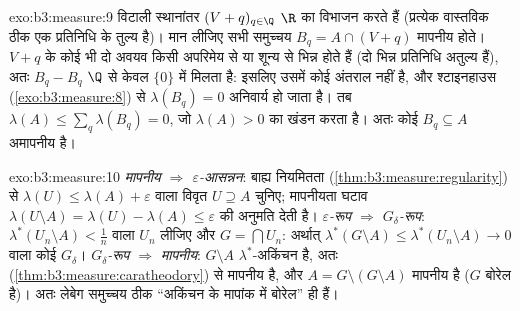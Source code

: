 \begin{solution}{exo:b3:measure:9}
विटाली स्थानांतर $(V + q)_{q\in\Q}$ $\R$ का विभाजन करते हैं (प्रत्येक वास्तविक
ठीक एक प्रतिनिधि के तुल्य है)। मान लीजिए सभी समुच्चय $B_q = A \cap (V + q)$ मापनीय
होते। $V + q$ के कोई भी दो अवयव किसी अपरिमेय से या शून्य से भिन्न होते
हैं (दो भिन्न प्रतिनिधि अतुल्य हैं), अतः $B_q - B_q$ $\Q$ से केवल $\{0\}$
में मिलता है: इसलिए उसमें कोई अंतराल नहीं है, और श्टाइनहाउस (\cref{exo:b3:measure:8})
से $\lambda(B_q) = 0$ अनिवार्य हो जाता है। तब $\lambda(A) \leq \sum_{q}\lambda(B_q) = 0$, जो $\lambda(A) > 0$ का खंडन करता है।
अतः कोई $B_q \subseteq A$ अमापनीय है।
\end{solution}

\begin{solution}{exo:b3:measure:10}
\emph{मापनीय $\Rightarrow$ $\varepsilon$-आसन्नन}: बाह्य नियमितता (\cref{thm:b3:measure:regularity}) से $\lambda(U) \leq \lambda(A) +
\varepsilon$
वाला विवृत $U \supseteq A$ चुनिए; मापनीयता घटाव $\lambda(U\setminus A) = \lambda(U) - \lambda(A) \leq
\varepsilon$ की अनुमति देती है।
\emph{$\varepsilon$-रूप $\Rightarrow$ $G_\delta$-रूप}: $\lambda^*(U_n\setminus
A) < \frac1n$ वाला $U_n$ लीजिए और $G = \bigcap U_n$:
अर्थात् $\lambda^*(G\setminus A) \leq \lambda^*(U_n\setminus A) \to 0$ वाला कोई $G_\delta$। \emph{$G_\delta$-रूप $\Rightarrow$ मापनीय}: $G\setminus
A$
$\lambda^*$-अकिंचन है, अतः  (\cref{thm:b3:measure:caratheodory}) से मापनीय है, और $A = G \setminus
(G\setminus A)$ मापनीय
है ($G$ बोरेल है)। अतः लेबेग समुच्चय ठीक ``अकिंचन के मापांक में
बोरेल'' ही हैं।
\end{solution}

